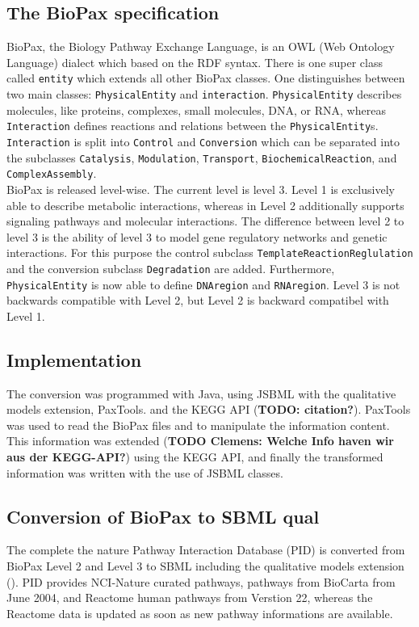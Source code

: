 \documentclass{bioinfo}
\begin{document}
\begin{methods}
\subsection{The BioPax specification}
BioPax, the Biology Pathway Exchange Language, is an OWL (Web Ontology Language) dialect which based on the RDF syntax. There is one super class called \texttt{entity} which extends all other BioPax classes. One distinguishes between two main classes: \texttt{PhysicalEntity} and \texttt{interaction}. \texttt{PhysicalEntity} describes molecules, like proteins, complexes, small molecules, DNA, or RNA, whereas \texttt{Interaction} defines reactions and relations between the \texttt{PhysicalEntity}s. \texttt{Interaction} is split into \texttt{Control} and \texttt{Conversion} which can be separated into the subclasses \texttt{Catalysis}, \texttt{Modulation}, \texttt{Transport}, \texttt{BiochemicalReaction}, and \texttt{Complex\-Assembly}.\\
BioPax is released level-wise. The current level is level 3. Level 1 is exclusively able to describe metabolic interactions, whereas in Level 2 additionally supports signaling pathways and molecular interactions. The difference between level 2 to level 3 is the ability of level 3 to model gene regulatory networks and genetic interactions. For this purpose the control subclass \texttt{TemplateReactionReglulation} and the conversion subclass \texttt{Degradation} are added. Furthermore, \texttt{PhysicalEntity} is now able to define \texttt{DNAregion} and \texttt{RNAregion}.
Level 3 is not backwards compatible with Level 2, but Level 2 is backward compatibel with Level 1. \citep{Demir2010}
\subsection{Implementation}
The conversion was programmed with Java, using JSBML \citep{Draeger2011} with the qualitative models extension, PaxTools. and the KEGG API (\textbf{TODO: citation?}). PaxTools was used to read the BioPax files and to manipulate the information content. This information was extended (\textbf{TODO Clemens: Welche Info haven wir aus der KEGG-API?}) using the KEGG API, and finally the transformed information was written with the use of JSBML classes.\\
\subsection{Conversion of BioPax to SBML qual}
The complete the nature Pathway Interaction Database (PID) is converted from BioPax Level 2 and Level 3 to SBML including the qualitative models extension (\citep{Schaefer2009}). PID provides NCI-Nature curated pathways, pathways from BioCarta from June 2004, and Reactome human pathways from Verstion 22, whereas the Reactome data is updated as soon as new pathway informations are available.\\


\end{methods}
\end{document}

